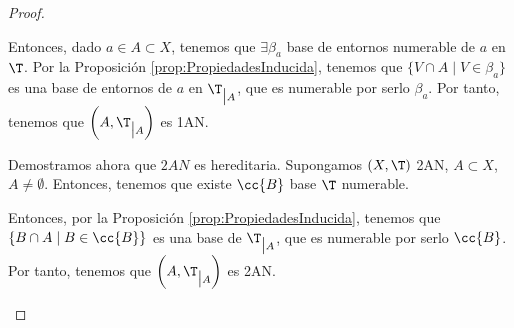 \begin{proof}
\begin{enumerate}
        Entonces, dado $a\in A\subset X$, tenemos que $\exists \beta_a$ base de entornos numerable de $a$ en $\T$. Por la Proposición \ref{prop:PropiedadesInducida}, tenemos que $\{V\cap A\mid V\in \beta_a\}$ es una base de entornos de $a$ en $\T_{\big| A}$, que es numerable por serlo $\beta_a$. Por tanto, tenemos que $\left(A,\T_{\big| A}\right)$ es 1AN.\vspace{1cm}

         Demostramos ahora que $2AN$ es hereditaria. Supongamos $(X,\T)$ 2AN, $A\subset X$, $A\neq \emptyset$. Entonces, tenemos que existe $\cc{B}$ base $\T$ numerable.

        Entonces, por la Proposición \ref{prop:PropiedadesInducida}, tenemos que $\{B\cap A\mid B\in \cc{B}\}$ es una base de $\T_{\big| A}$, que es numerable por serlo $\cc{B}$. Por tanto, tenemos que $\left(A,\T_{\big| A}\right)$ es 2AN.        
    \end{enumerate}
\end{proof}


